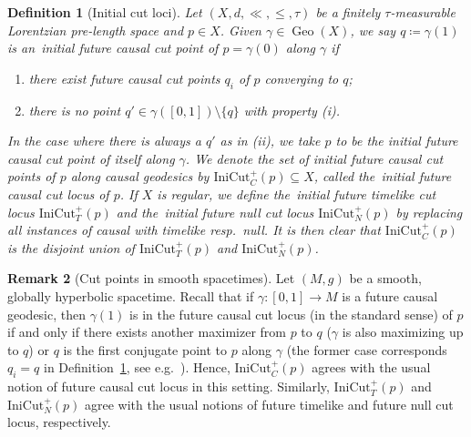\documentclass[a4paper,11pt]{article}
\numberwithin{equation}{section}
\theoremstyle{plain}
\newtheorem{Definition}{Definition}[section]
\theoremstyle{definition}
\newtheorem{Remark}[Definition]{Remark}
\DeclareMathOperator{\Geo}{Geo}
\begin{document}
\begin{Definition}[Initial cut loci]
\label{Definition: firstcutlocus}
Let $(X,d,\ll,\leq,\tau)$ be a finitely $\tau$-measurable Lorentzian pre-length space and $p \in X$. Given $\gamma \in \Geo(X)$, we say $q \coloneqq \gamma(1)$ is an~\emph{initial future causal cut point\/} of $p=\gamma(0)$ along $\gamma$ if
\begin{enumerate}
    \item there exist future causal cut points $q_i$ of $p$ converging to $q$;
    \item there is no point $q' \in \gamma([0,1]) \setminus \{q\}$ with property (i).
\end{enumerate}
In the case where there is always a $q'$ as in (ii), we take $p$ to be the initial future causal cut point of itself along $\gamma$. We denote the set of initial future causal cut points of $p$ along causal geodesics by $\mathrm{IniCut}_C^+(p) \subseteq X$, called the~\emph{initial future causal cut locus\/} of $p$.
If $X$ is regular, we define the~\emph{initial future timelike cut locus} $\mathrm{IniCut}_T^+(p)$ and the~\emph{initial future null cut locus} $\mathrm{IniCut}_N^+(p)$ by replacing all instances of causal with timelike resp.\ null. It is then clear that $\mathrm{IniCut}_C^+(p)$ is the disjoint union of $\mathrm{IniCut}_T^+(p)$ and $\mathrm{IniCut}_N^+(p)$.
\end{Definition}

\begin{Remark}[Cut points in smooth spacetimes]
Let $(M,g)$ be a smooth, globally hyperbolic spacetime. Recall that if $\gamma \colon [0,1] \to M$ is a future causal geodesic, then $\gamma(1)$ is in the future causal cut locus (in the standard sense) of $p$ if and only if there exists another maximizer from $p$ to $q$ ($\gamma$ is also maximizing up to $q$) or $q$ is the first conjugate point to $p$ along $\gamma$ (the former case corresponds $q_i = q$ in Definition~\ref{Definition: firstcutlocus}, see e.g.\ \cite[Prop.\ 3.2.30]{Treude:2011}). 
Hence, $\mathrm{IniCut}_C^+(p)$ agrees with the usual notion of future causal cut locus in this setting. Similarly, $\mathrm{IniCut}_T^+(p)$ and $\mathrm{IniCut}_N^+(p)$ agree with the usual notions of future timelike and future null cut locus, respectively.
\end{Remark}
\end{document}
